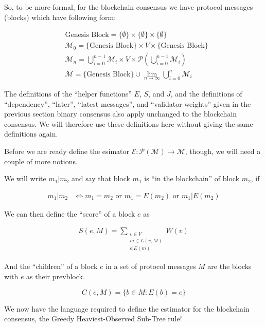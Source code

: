 \documentclass{article}
\theoremstyle{definition}
\begin{document}
So, to be more formal, for the blockchain consensus we have protocol messages (blocks) which have following form:

\begin{equation}
\begin{split}
	&\text{Genesis Block} = \{\emptyset\} \times \{\emptyset\} \times \{\emptyset\}\\
    &\mathcal{M}_0 = \{\text{Genesis Block}\} \times V \times \{\text{Genesis Block}\}\\
    &\mathcal{M}_n = \bigcup_{i=0}^{n-1} \mathcal{M}_i \times V \times \mathcal{P}(\bigcup_{i=0}^{n-1} \mathcal{M}_i)\\
    &\mathcal{M} = \{\text{Genesis Block}\} \cup \lim_{n \to \infty} \bigcup_{i=0}^{n} \mathcal{M}_i
\end{split}
\end{equation}

The definitions of the ``helper functions'' $E$, $S$, and $J$, and the definitions of ``dependency'', ``later'', ``latest messages'', and ``validator weights'' given in the previous section binary consensus also apply unchanged to the blockchain consensus. We will therefore use these definitions here without giving the same definitions again. 

Before we are ready define the esimator $\mathcal{E}: \mathcal{P}(\mathcal{M}) \to \mathcal{M}$, though, we will need a couple of more notions.

We will write $m_1 | m_2$ and say that block $m_1$ is ``in the blockchain'' of block $m_2$, if 

\begin{align}
	m_1 | m_2 &\iff m_1 = m_2 \text{ or } m_1 = E(m_2) \text{ or } m_1 | E(m_2) 
\end{align}

We can then define the ``score'' of a block $e$ as

\begin{align}
S(e, M) = \sum_{\substack{v \in V \\ m \in L(v,M) \\ e|E(m)}} W(v)
\end{align}

And the ``children'' of a block $e$ in a set of protocol messages $M$ are the blocks with $e$ as their prevblock.

$$
C(e,M) = \{b \in M : E(b) = e\}
$$

We now have the language required to define the estimator for the blockchain consensus, the Greedy Heaviest-Observed Sub-Tree rule!
\end{document}

